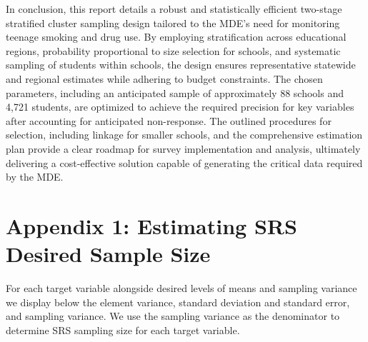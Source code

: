 \documentclass[
  12pt]{article}
\begin{document}
In conclusion, this report details a robust and statistically efficient
two-stage stratified cluster sampling design tailored to the MDE's need
for monitoring teenage smoking and drug use. By employing stratification
across educational regions, probability proportional to size selection
for schools, and systematic sampling of students within schools, the
design ensures representative statewide and regional estimates while
adhering to budget constraints. The chosen parameters, including an
anticipated sample of approximately 88 schools and 4,721 students, are
optimized to achieve the required precision for key variables after
accounting for anticipated non-response. The outlined procedures for
selection, including linkage for smaller schools, and the comprehensive
estimation plan provide a clear roadmap for survey implementation and
analysis, ultimately delivering a cost-effective solution capable of
generating the critical data required by the MDE.

\newpage

\section{Appendix 1: Estimating SRS Desired Sample
Size}\label{appendix-1-estimating-srs-desired-sample-size}

For each target variable alongside desired levels of means and sampling
variance we display below the element variance, standard deviation and
standard error, and sampling variance. We use the sampling variance as
the denominator to determine SRS sampling size for each target variable.
\end{document}
